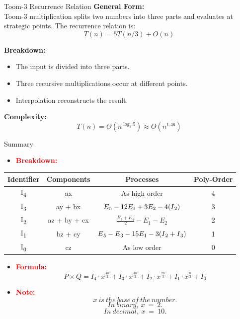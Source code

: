\documentclass{beamer}
\begin{document}
 \begin{frame}{Toom-3 Recurrence Relation}
    \textbf{General Form:} \\[5pt]
    Toom-3 multiplication splits two numbers into three parts and evaluates at strategic points. The recurrence relation is:
    \[
    T(n) = 5T(n/3) + O(n)
    \]
    
    \textbf{Breakdown:}
    \begin{itemize}
        \item The input is divided into three parts.
        \item Three recursive multiplications occur at different points.
        \item Interpolation reconstructs the result.
    \end{itemize}
    
    \textbf{Complexity:}
    \[
    T(n) = \Theta(n^{\log_3 5}) \approx O(n^{1.46})
    \]
\end{frame}

\begin{frame}{Summary}
  \begin{itemize}
      \item \textbf{\textcolor{red}{Breakdown:}}
  \end{itemize}
    \begin{table}[h]
        \centering
        \begin{tabular}{|c|c|c|c|}
            \hline
            \textbf{Identifier} & \textbf{Components} & \textbf{Processes} & \textbf{Poly-Order} \\ \hline
            I\textsubscript{4} & ax & As high order & 4 \\ \hline
            I\textsubscript{3} & ay + bx & \(E\textsubscript{5} -12 E_1 + 3 E_2 - 4(I\textsubscript{2})\) & 3 \\ \hline
            I\textsubscript{2} & az + by + cx & \( \frac{E_3 + E_4}{2} - E_1 - E_2 \) & 2 \\ \hline
            I\textsubscript{1} & bz + cy & \( E\textsubscript{5} - E\textsubscript{3} - 15E_1 - 3(I\textsubscript{2} + I\textsubscript{3}) \) & 1 \\ \hline
            I\textsubscript{0} & cz & As low order & 0\\ \hline
        \end{tabular}
    \end{table}
    \begin{itemize}
    \item \textbf{\textcolor{red}{Formula:}}
    \[
    P \times Q = I_4 \cdot x^{\frac{4n}{3}} + I_3 \cdot x^{\frac{3n}{3}} + I_2 \cdot x^{\frac{2n}{3}} + I_1 \cdot x^{\frac{n}{3}} + I_0 
    \]
    \item \textbf{\textcolor{red}{Note:}}
    \[
    x \ is \ the \ base \ of \ the \ number.
    \]
    \[
    In \ binary, \ x \ = \ 2.
    \]
    \[
    In \ decimal,\  x \ = \ 10.
    \]
    \end{itemize}
\end{frame}
\end{document}
